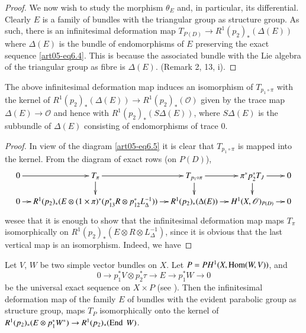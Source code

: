 \begin{proof}
We now wish to study the morphism $\theta_{E}$ and, in particular, its
differential. Clearly $E$ is a family of bundles with the triangular
group as structure group. As such, there is an infinitesimal
deformation map $T_{P(D)}\to R^{1}(p_{2})_{*}(\Delta(E))$ where
$\Delta(E)$ is the bundle of endomorphisms of $E$ preserving the exact
sequence \eqref{art05-eq6.4}. This is because the associated bundle
with the Lie algebra of the triangular group as fibre is
$\Delta(E)$. (Remark 2, 13, i).
\end{proof}

\setcounter{theorem}{5}
\begin{lemma}\label{art05-lem6.6}
The above infinitesimal deformation map induces an isomorphism of
$T_{p_{1}\circ \pi}$ with the kernel of
$R^{1}(p_{2})_{*}(\Delta(E))\to R^{1}(p_{2})_{*}(\mathscr{O})$ given
by the trace map $\Delta(E)\to \mathscr{O}$ and hence with
$R^{1}(p_{2})_{*}(S\Delta(E))$, where $S\Delta(E)$ is the subbundle of
$\Delta(E)$ consisting of endomorphisms of trace $0$.
\end{lemma}

\begin{proof}
In view of the diagram \ref{art05-eq6.5} it is clear that
$T_{p_{1}\circ \pi}$ is mapped into the kernel. From the diagram of
exact rows (on $P(D)$),
{\fontsize{9pt}{11pt}\selectfont
\[
\xymatrix@C=.35cm@R=.5cm{
0\ar[r] & T_{\pi}\ar[r]\ar[d] & T_{p_{1}\circ \pi}\ar[r]\ar[d]
& \pi^{*}p_{2}^{*}T_{J}\ar[r]\ar[d] & 0\\
0\ar[r] & R^{1}(p_{2})_{*}(E\otimes
(1\times \pi)^{*}(p^{*}_{13}R\otimes p^{*}_{12}L_{\Delta}^{-1}))\ar[r]
& R^{1}(p_{2})_{*}(\Delta(E))\ar[r] &
H^{1}(X,\mathscr{O})_{P(D)}\ar[r] & 0
}
\]}
we\pageoriginale see that it is enough to show that the infinitesimal
deformation map maps $T_{\pi}$ isomorphically on
$R^{1}(p_{2})_{*}(E\otimes R\otimes L_{\Delta}^{-1})$, since it is
obvious that the last vertical map is an isomorphism. Indeed, we have
\end{proof}

\begin{lemma}\label{art05-lem6.7}
Let $V$, $W$ be two simple vector bundles on $X$. Let
$P=PH^{1}(X,\operatorname{Hom}(W,V))$, and
$$
0\to p^{*}_{1}V\otimes p^{*}_{2}\tau\to E\to p^{*}_{1}W\to 0
$$
be the universal exact sequence on $X\times P$ (see \cite[Lemma
2.3]{art05-key6}). Then the infinitesimal deformation map of the
family $E$ of bundles with the evident parabolic group as structure
group, maps $T_{P}$ isomorphically onto the kernel of
$R^{1}(p_{2})_{*}(E\otimes p^{*}_{1}W^{*})\to R^{1}(p_{2})_{*}(\operatorname{End}\
W)$. 
\end{lemma}

